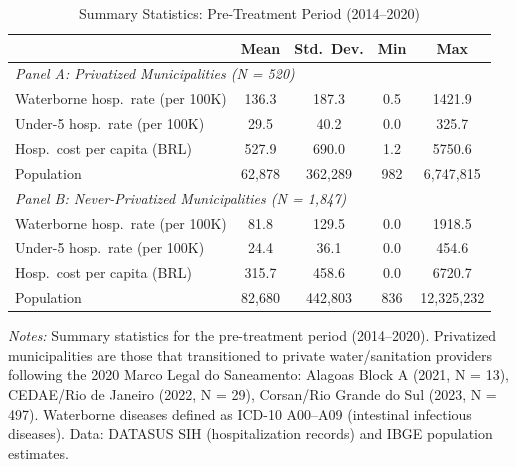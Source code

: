 \begin{table}[H]
\centering
\caption{Summary Statistics: Pre-Treatment Period (2014--2020)}
\label{tab:summary}
\begin{threeparttable}
\begin{tabular}{lcccc}
\toprule
 & Mean & Std.\ Dev. & Min & Max \\
\midrule
\multicolumn{5}{l}{\textit{Panel A: Privatized Municipalities (N = 
520)}} \\
  Waterborne hosp.\ rate (per 100K) & 136.3 & 187.3 & 0.5 & 1421.9 \\
  Under-5 hosp.\ rate (per 100K) & 29.5 & 40.2 & 0.0 & 325.7 \\
  Hosp.\ cost per capita (BRL) & 527.9 & 690.0 & 1.2 & 5750.6 \\
  Population & 62,878 & 362,289 & 982 & 6,747,815 \\
\midrule
\multicolumn{5}{l}{\textit{Panel B: Never-Privatized Municipalities (N = 
1,847)}} \\
  Waterborne hosp.\ rate (per 100K) & 81.8 & 129.5 & 0.0 & 1918.5 \\
  Under-5 hosp.\ rate (per 100K) & 24.4 & 36.1 & 0.0 & 454.6 \\
  Hosp.\ cost per capita (BRL) & 315.7 & 458.6 & 0.0 & 6720.7 \\
  Population & 82,680 & 442,803 & 836 & 12,325,232 \\
\bottomrule
\end{tabular}
\begin{tablenotes}[flushleft]
\small
\item \textit{Notes:} Summary statistics for the pre-treatment period (2014--2020). Privatized municipalities are those that transitioned to private water/sanitation providers following the 2020 Marco Legal do Saneamento: Alagoas Block A (2021, N = 13), CEDAE/Rio de Janeiro (2022, N = 29), Corsan/Rio Grande do Sul (2023, N = 497). Waterborne diseases defined as ICD-10 A00--A09 (intestinal infectious diseases). Data: DATASUS SIH (hospitalization records) and IBGE population estimates.
\end{tablenotes}
\end{threeparttable}
\end{table}
